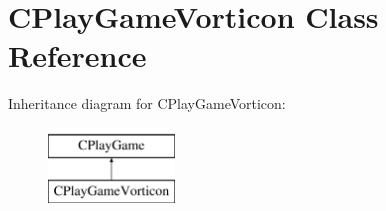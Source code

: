 \hypertarget{class_c_play_game_vorticon}{
\section{CPlayGameVorticon Class Reference}
\label{class_c_play_game_vorticon}
}
Inheritance diagram for CPlayGameVorticon:\begin{figure}[H]
\begin{center}
\leavevmode
\includegraphics[height=2cm]{class_c_play_game_vorticon}
\end{center}
\end{figure}
